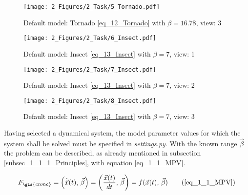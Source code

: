 \begin{figure}[!h]
    \begin{minipage}[h]{0.47\textwidth}
        \centering
        \texttt{[image: 2\_Figures/2\_Task/5\_Tornado.pdf]}
        \caption{Default model: Tornado \eqref{eq_12_Tornado} with $\beta =16.78$, view: 3}
        \label{fig_8_Tornado}    
    \end{minipage}
    \hfill
    \begin{minipage}{0.47\textwidth}
        \centering
        \texttt{[image: 2\_Figures/2\_Task/6\_Insect.pdf]}
        \caption{Default model: Insect \eqref{eq_13_Insect} with $\beta =7$, view: 1}
        \label{fig_9_Insect}    
    \end{minipage}
\end{figure}

\begin{figure}[!h]
    \begin{minipage}[h]{0.47\textwidth}
        \centering
        \texttt{[image: 2\_Figures/2\_Task/7\_Insect.pdf]}
        \caption{Default model: Insect \eqref{eq_13_Insect} with $\beta =7$, view: 2}
        \label{fig_10_Insect}    
    \end{minipage}
    \hfill
    \begin{minipage}{0.47\textwidth}
        \centering
        \texttt{[image: 2\_Figures/2\_Task/8\_Insect.pdf]}
        \caption{Default model: Insect \eqref{eq_13_Insect} with $\beta =7$, view: 3}
        \label{fig_11_Insect}    
    \end{minipage}
\end{figure} 
\newpage
Having selected a dynamical system, the model parameter values for which the system shall be solved must be specified in \emph{settings.py}. 
With the known range $\vec{\beta}$ the problem can be described, as already mentioned in subsection \ref{subsec_1_1_1_Principles}, with equation \eqref{eq_1_1_MPV}.

\begin{equation}
    F_{\gls{cnmc}} = \left(\dot{\vec{x}}(t), \, \vec{\beta} \right) = 
    \left( \frac{\vec{x}(t)}{dt}, \, \vec{\beta} \right) =
     f(\vec{x}(t), \, \vec{\beta} )
     \tag{\ref{eq_1_1_MPV}}
\end{equation}

